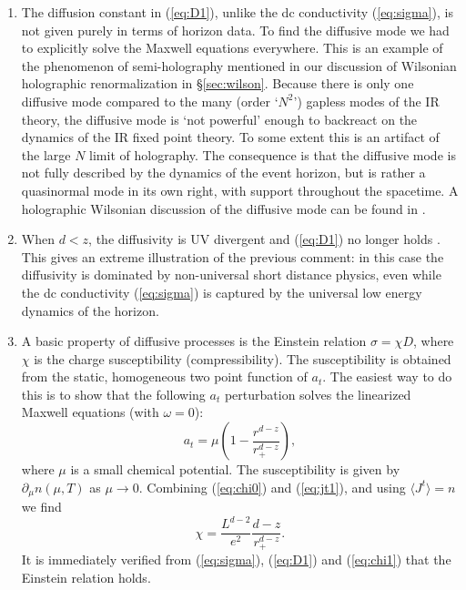 \documentclass[10pt, oneside]{book}
\begin{document}
\begin{doublespace}
\begin{enumerate}
\item The diffusion constant in (\ref{eq:D1}), unlike the dc conductivity (\ref{eq:sigma}), is not given purely in terms of horizon data. To find the diffusive mode we had to explicitly solve the Maxwell equations everywhere. This is an example of the phenomenon of semi-holography mentioned in our discussion of Wilsonian holographic renormalization in \S\ref{sec:wilson}. Because there is only one diffusive mode compared to the many (order `$N^2$') gapless modes of the IR theory, the diffusive mode is `not powerful' enough to backreact on the dynamics of the IR fixed point theory. To some extent this is an artifact of the large $N$ limit of holography. The consequence is that the diffusive mode is not fully described by the dynamics of the event horizon, but is rather a quasinormal mode in its own right, with support throughout the spacetime. A holographic Wilsonian discussion of the diffusive mode can be found in \cite{Iqbal:2008by,Faulkner:2010jy,Nickel:2010pr}.
\item When $d < z$,  the diffusivity is UV divergent and (\ref{eq:D1}) no longer holds \cite{Pang:2009wa}. This gives an extreme illustration of the previous comment: in this case the diffusivity is dominated by non-universal short distance physics, even while the dc conductivity (\ref{eq:sigma}) is captured by the universal low energy dynamics of the horizon.
\item A basic property of diffusive processes is the Einstein relation $\sigma = \chi D$, where $\chi$ is the charge susceptibility (compressibility). The susceptibility is obtained from the static, homogeneous two point function of $a_t$.  The easiest way to do this is to show that the following $a_t$ perturbation solves the linearized Maxwell equations (with $\omega=0$): \begin{equation}
a_t = \mu \left(1-\frac{r^{d-z}}{r_+^{d-z}}\right),  \label{eq:chi0}
\end{equation}
where $\mu$ is a small chemical potential.   The susceptibility is given by $\partial_\mu n(\mu,T)$ as $\mu\rightarrow 0$.   Combining (\ref{eq:chi0}) and (\ref{eq:jt1}), and using $\langle J^t\rangle=n$ we find  \begin{equation}
\chi = \frac{L^{d-2}}{e^2} \frac{d-z}{r_+^{d-z}}.  \label{eq:chi1}
\end{equation}
It is immediately verified from (\ref{eq:sigma}), (\ref{eq:D1}) and (\ref{eq:chi1}) that the Einstein relation holds.

\end{enumerate}


\end{doublespace}
\end{document}
